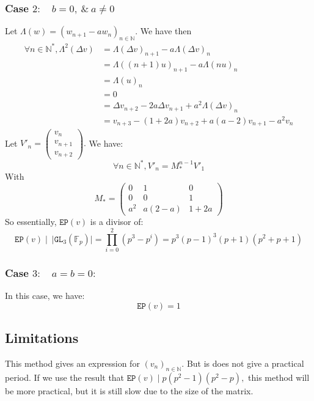 \documentclass[]{article}
\begin{document}
\subsubsection{Case $2: \quad b = 0, \ \& \ a\neq 0$}
Let $\Lambda(w) = (w_{n+1}-aw_n)_{n\in\mathbb{N}}.$
\newline 
We have then
\begin{align*}
	\forall n\in\mathbb{N}^*, \Lambda^2(\Delta v)&=\Lambda (\Delta v)_{n+1} - a \Lambda (\Delta v)_n\\
	&= \Lambda((n+1)u)_{n+1}- a\Lambda(nu)_n\\
	&= \Lambda(u)_n\\
	&= 0 \\
	&= \Delta v_{n+2}-2a\Delta v_{n+1} + a^2 \Lambda (\Delta v)_n\\
	&= v_{n+3}-(1+2a)v_{n+2}+a(a-2)v_{n+1}-a^2v_n
\end{align*}
Let $V'_n=\begin{pmatrix}
	v_n \\ v_{n+1} \\ v_{n+2}
\end{pmatrix}.$ We have:
$$
\forall n\in\mathbb{N}^*, V'_n = M_*^{n-1}V'_1
$$
With \begin{equation*}
	M_*=\begin{pmatrix}
		0 & 1 & 0\\
		0 & 0 & 1\\
		a^2 & a(2-a) & 1+2a
	\end{pmatrix}
\end{equation*}
So essentially, $\mathtt{EP}(v)$ is a divisor of:
\begin{equation*}
	\mathtt{EP}(v) \mid \ \lvert \mathtt{GL}_3(\mathbb{F}_p) \rvert  = \prod_{i=0}^2 (p^3-p^i) = p^3(p-1)^3(p+1)(p^2+p+1)
\end{equation*}
\subsubsection{Case $3: \quad a=b=0:$} In this case, we have:
\begin{equation*}
 \mathtt{EP}(v)=1
\end{equation*}
\subsection{Limitations}
This method gives an expression for $(v_n)_{n\in\mathbb{N}}.$ But is does not give a practical period.
\newline
If we use the result that $\mathtt{EP}(v) \mid p(p^2-1)(p^2-p),$ this method will be more practical, but it is still slow due to the size of the matrix.
\pagebreak
\end{document}
